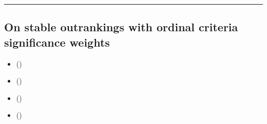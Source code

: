 \documentclass[a4paper,12pt,english]{sphinxhowto}
\begin{document}
\bigskip\hrule\bigskip



\subsection{On stable outrankings with ordinal criteria significance weights}
\label{\detokenize{pearls:on-stable-outrankings-with-ordinal-criteria-significance-weights}}\label{\detokenize{pearls:stable-outranking-tutorial-label}}
\begin{sphinxcontents}
\begin{itemize}
\item {} 
\sphinxAtStartPar
{}\label{\detokenize{pearls:id143}}{\hyperref[\detokenize{pearls:cardinal-or-ordinal-criteria-significance-weights}]{}} ()

\item {} 
\sphinxAtStartPar
{}\label{\detokenize{pearls:id144}}{\hyperref[\detokenize{pearls:qualifying-the-stability-of-outranking-situations}]{}} ()

\item {} 
\sphinxAtStartPar
{}\label{\detokenize{pearls:id145}}{\hyperref[\detokenize{pearls:computing-the-stability-denotation-of-outranking-situations}]{}} ()

\item {} 
\sphinxAtStartPar
{}\label{\detokenize{pearls:id146}}{\hyperref[\detokenize{pearls:robust-bipolar-valued-outranking-digraphs}]{}} ()

\end{itemize}
\end{sphinxcontents}
\end{document}

